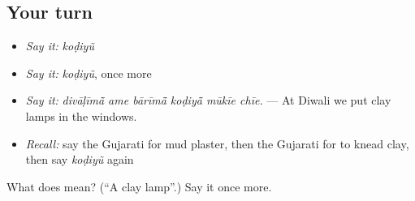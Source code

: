 \subsection*{Your turn}
\begin{itemize}
\raggedright
  \item \emph{Say it:} \emph{koḍiyũ}
  \item \emph{Say it:} \emph{koḍiyũ}, once more
  \item \emph{Say it:} \emph{divāḷīmā̃ ame bārīmā̃ koḍiyā̃ mūkīe chīe.} — At Diwali we put clay lamps in the windows.
  \item \emph{Recall:} say the Gujarati for mud plaster, then the Gujarati for to knead clay, then say \emph{koḍiyũ} again
\end{itemize}

\begin{tcolorbox}[breakable,colback=teal!4,colframe=teal!35!black,title={Before you move on}]
What does  mean? (\textquotedblleft{}A clay lamp\textquotedblright{}.) Say it once more.
\end{tcolorbox}
